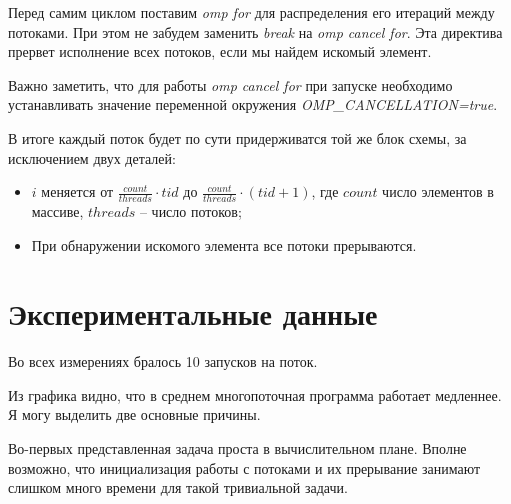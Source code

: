 \documentclass[a4paper, 12pt]{article}
\begin{document}
Перед самим циклом поставим \textit{omp for} для распределения его итераций между потоками. При этом не забудем заменить \textit{break} на \textit{omp cancel for}. Эта директива прервет исполнение всех потоков, если мы найдем искомый элемент.

Важно заметить, что для работы \textit{omp cancel for} при запуске необходимо устанавливать значение переменной окружения \textit{OMP\_CANCELLATION=true}.

В итоге каждый поток будет по сути придерживатся той же блок схемы, за исключением двух деталей:
\begin{itemize}
 \item $i$ меняется от $\frac{count}{threads} \cdot tid$ до $\frac{count}{threads} \cdot (tid + 1)$, где $count$ число элементов в массиве, $threads$ -- число потоков;
 \item При обнаружении искомого элемента все потоки прерываются.
\end{itemize}



\section{Экспериментальные данные}

Во всех измерениях бралось 10 запусков на поток.

\vspace{0.3cm}


\vspace{0.5cm}

Из графика видно, что в среднем многопоточная программа работает медленнее. Я могу выделить две основные причины.

Во-первых представленная задача проста в вычислительном плане. Вполне возможно, что инициализация работы с потоками и их прерывание занимают слишком много времени для такой тривиальной задачи.
\end{document}
